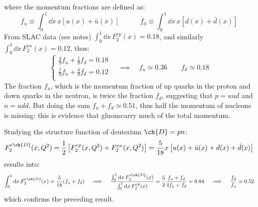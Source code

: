 where the momentum fractions are defined as:
\begin{equation*}
  f_u \equiv \int_0^1 \dd x \, x \left[ u(x) + \bar{u}(x) \right]
  \qquad \quad
  f_d \equiv \int_0^1 \dd x \, x \left[ d(x) + \bar{d}(x) \right]
\end{equation*}
From SLAC data (see notes) $ \int_0^1 \dd x \, F_2^{ep}(x) = 0.18 $, and similarly $ \int_0^1 \dd x \, F_2^{en}(x) = 0.12 $, thus:
\begin{equation*}
  \begin{cases}
    \frac{4}{9} f_u + \frac{1}{9} f_d = 0.18 \\
    \frac{1}{9} f_u + \frac{4}{9} f_d = 0.12 \\
  \end{cases}
  \quad \implies \quad
  f_u \simeq 0.36
  \qquad
  f_d \simeq 0.18
\end{equation*}
The fraction $ f_u $, which is the momentum fraction of up quarks in the proton and down quarks in the neutron, is twice the fraction $ f_d $, suggesting that $ p = uud $ and $ n = udd $. But doing the sum $ f_u + f_d \simeq 0.51 $, thus half the momentum of nucleons is missing: this is evidence that gluons\footnotemark carry much of the total momentum.


Studying the structure function of deuterium $ \ch{D} = pn $:
\begin{equation*}
  F_2^{e\ch{D}}(x,Q^2) = \frac{1}{2} \left[ F_2^{ep}(x,Q^2) + F_2^{en}(x,Q^2) \right] = \frac{5}{18} x \left[ u(x) + \bar{u}(x) + d(x) + \bar{d}(x) \right]
\end{equation*}
results into:
\begin{equation*}
  \int_0^1 \dd x \, F_2^{e\ch{D}}(x) = \frac{5}{18} ( f_u + f_d )
  \quad \implies \quad
  \frac{\int_0^1 \dd x \, F_2^{e\ch{D}}(x)}{\int_0^1 \dd x \, F_2^{ep}(x)} = \frac{5}{2} \frac{f_u + f_d}{4 f_u + f_d} = 0.84
  \quad \implies \quad
  \frac{f_d}{f_u} \simeq 0.52
\end{equation*}
which confirms the preceding result.

